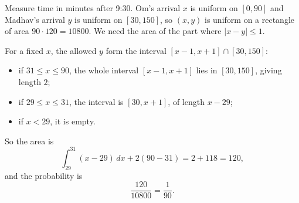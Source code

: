 Measure time in minutes after 9:30. Om's arrival $x$ is uniform on $[0,90]$ and Madhav's arrival $y$ is uniform on $[30,150]$, so $(x,y)$ is uniform on a rectangle of area $90\cdot120=10800$. We need the area of the part where $|x-y|\le1$.

For a fixed $x$, the allowed $y$ form the interval $[x-1,x+1]\cap[30,150]$:
\begin{itemize}
\item if $31\le x\le 90$, the whole interval $[x-1,x+1]$ lies in $[30,150]$, giving length $2$;
\item if $29\le x\le 31$, the interval is $[30,x+1]$, of length $x-29$;
\item if $x<29$, it is empty.
\end{itemize}
So the area is
\[
\int_{29}^{31}(x-29)\,dx+2(90-31)=2+118=120,
\]
and the probability is
\[
\dfrac{120}{10800}=\boxed{\dfrac{1}{90}}.
\]
